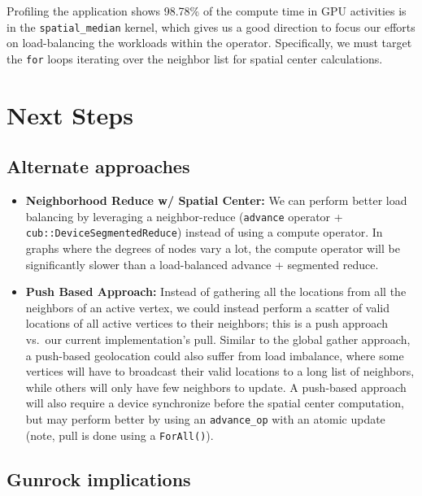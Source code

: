 \documentclass[10pt,oneside]{memoir}
\begin{document}
Profiling the application shows 98.78\% of the compute time in GPU
activities is in the \texttt{spatial\_median} kernel, which gives us a
good direction to focus our efforts on load-balancing the workloads
within the operator. Specifically, we must target the \texttt{for} loops
iterating over the neighbor list for spatial center calculations.

\hypertarget{next-steps-1}{%
\section{Next Steps}\label{next-steps-1}}

\hypertarget{alternate-approaches}{%
\subsection{Alternate approaches}\label{alternate-approaches}}

\begin{itemize}
\item
  \textbf{Neighborhood Reduce w/ Spatial Center:} We can perform better
  load balancing by leveraging a neighbor-reduce (\texttt{advance}
  operator + \texttt{cub::DeviceSegmentedReduce}) instead of using a
  compute operator. In graphs where the degrees of nodes vary a lot, the
  compute operator will be significantly slower than a load-balanced
  advance + segmented reduce.
\item
  \textbf{Push Based Approach:} Instead of gathering all the locations
  from all the neighbors of an active vertex, we could instead perform a
  scatter of valid locations of all active vertices to their neighbors;
  this is a push approach vs.~our current implementation's pull. Similar
  to the global gather approach, a push-based geolocation could also
  suffer from load imbalance, where some vertices will have to broadcast
  their valid locations to a long list of neighbors, while others will
  only have few neighbors to update. A push-based approach will also
  require a device synchronize before the spatial center computation,
  but may perform better by using an \texttt{advance\_op} with an atomic
  update (note, pull is done using a \texttt{ForAll()}).
\end{itemize}

\hypertarget{gunrock-implications}{%
\subsection{Gunrock implications}\label{gunrock-implications}}
\end{document}
